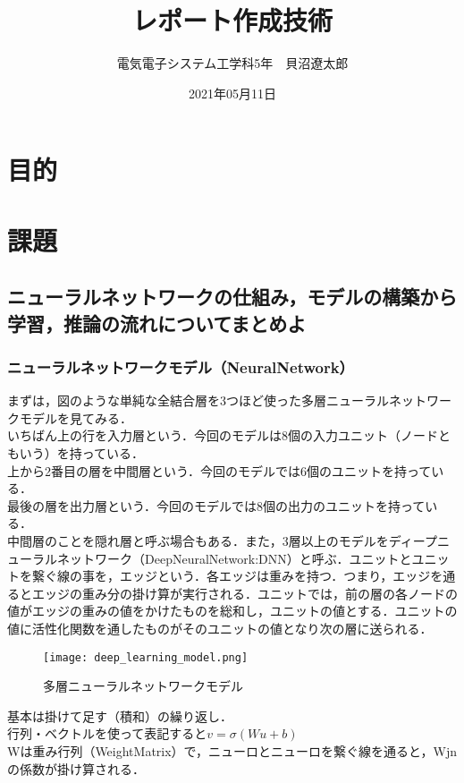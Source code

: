 \documentclass[uplatex,titlepage]{jsarticle}
\title{レポート作成技術}
\author{電気電子システム工学科5年　貝沼遼太郎}
\date{2021年05月11日}
\begin{document}
\maketitle
\section{目的}

\section{課題}
\subsection{ニューラルネットワークの仕組み，モデルの構築から学習，推論の流れについてまとめよ}
\subsubsection{ニューラルネットワークモデル（NeuralNetwork）}
まずは，図のような単純な全結合層を3つほど使った多層ニューラルネットワークモデルを見てみる．\\
いちばん上の行を入力層という．今回のモデルは8個の入力ユニット（ノードともいう）を持っている．\\
上から2番目の層を中間層という．今回のモデルでは6個のユニットを持っている．\\ 
最後の層を出力層という．今回のモデルでは8個の出力のユニットを持っている．\\
中間層のことを隠れ層と呼ぶ場合もある．また，3層以上のモデルをディープニューラルネットワーク（DeepNeuralNetwork:DNN）と呼ぶ．ユニットとユニットを繋ぐ線の事を，エッジという．各エッジは重みを持つ．つまり，エッジを通るとエッジの重み分の掛け算が実行される．ユニットでは，前の層の各ノードの値がエッジの重みの値をかけたものを総和し，ユニットの値とする．ユニットの値に活性化関数を通したものがそのユニットの値となり次の層に送られる．
\begin{figure}[H]%
    \begin{center}
    \texttt{[image: deep\_learning\_model.png]} 
    \caption{多層ニューラルネットワークモデル}
    \end{center}
\end{figure}
基本は掛けて足す（積和）の繰り返し．\\
行列・ベクトルを使って表記すると$v=\sigma(Wu+b)$\\
Wは重み行列（WeightMatrix）で，ニューロとニューロを繋ぐ線を通ると，Wjnの係数が掛け算される．
\end{document}
